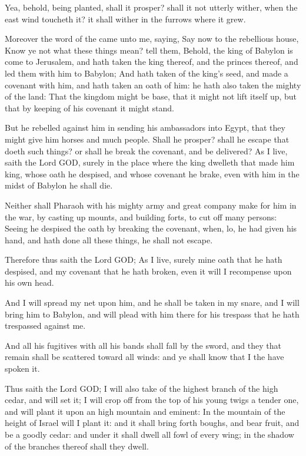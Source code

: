 \Verse Yea, behold, being planted, shall it prosper? shall it not utterly wither, when the east wind toucheth it? it shall wither in the furrows where it grew.

\Verse Moreover the word of the \LORD came unto me, saying, \Verse Say now to the rebellious house, Know ye not what these things mean?  tell them, Behold, the king of Babylon is come to Jerusalem, and hath taken the king thereof, and the princes thereof, and led them with him to Babylon; \Verse And hath taken of the king's seed, and made a covenant with him, and hath taken an oath of him: he hath also taken the mighty of the land: \Verse That the kingdom might be base, that it might not lift itself up, but that by keeping of his covenant it might stand.

\Verse But he rebelled against him in sending his ambassadors into Egypt, that they might give him horses and much people. Shall he prosper? shall he escape that doeth such things? or shall he break the covenant, and be delivered?  \Verse As I live, saith the Lord GOD, surely in the place where the king dwelleth that made him king, whose oath he despised, and whose covenant he brake, even with him in the midst of Babylon he shall die.

\Verse Neither shall Pharaoh with his mighty army and great company make for him in the war, by casting up mounts, and building forts, to cut off many persons: \Verse Seeing he despised the oath by breaking the covenant, when, lo, he had given his hand, and hath done all these things, he shall not escape.

\Verse Therefore thus saith the Lord GOD; As I live, surely mine oath that he hath despised, and my covenant that he hath broken, even it will I recompense upon his own head.

\Verse And I will spread my net upon him, and he shall be taken in my snare, and I will bring him to Babylon, and will plead with him there for his trespass that he hath trespassed against me.

\Verse And all his fugitives with all his bands shall fall by the sword, and they that remain shall be scattered toward all winds: and ye shall know that I the \LORD have spoken it.

\Verse Thus saith the Lord GOD; I will also take of the highest branch of the high cedar, and will set it; I will crop off from the top of his young twigs a tender one, and will plant it upon an high mountain and eminent: \Verse In the mountain of the height of Israel will I plant it: and it shall bring forth boughs, and bear fruit, and be a goodly cedar: and under it shall dwell all fowl of every wing; in the shadow of the branches thereof shall they dwell.

